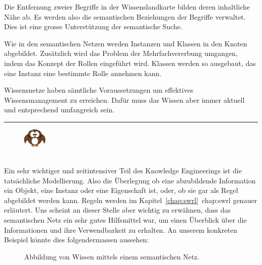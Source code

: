 Die Entfernung zweier Begriffe in der Wissenslandkarte bilden deren inhaltliche Nähe ab. Es werden also die semantischen Beziehungen der Begriffe verwaltet. Dies ist eine grosse Unterstützung der semantische Suche.

Wie in den semantischen Netzen werden Instanzen und Klassen in den Knoten abgebildet. Zusätzlich wird das Problem der Mehrfachvererbung umgangen, indem das Konzept der Rollen eingeführt wird. Klassen werden so ausgebaut, das eine Instanz eine bestimmte Rolle annehmen kann.

Wissensnetze haben sämtliche Voraussetzungen um effektives Wissensmanagement zu erreichen. Dafür muss das Wissen aber immer aktuell und entsprechend umfangreich sein.

\newpage

\noindent\rule[1ex]{\textwidth}{1pt}
\begin{figure}
    \vspace{-2pt}
    \includegraphics[width=0.1\textwidth]{bilder/owl.png}
\end{figure}\\
Ein sehr wichtiger und zeitintensiver Teil des Knowledge Engineerings ist die tatsächliche Modellierung. Also die Überlegung ob eine abzubildende Information ein Objekt, eine Instanz oder eine Eigenschaft ist, oder, ob sie gar als Regel abgebildet werden kann. Regeln werden im Kapitel~\ref{chap:swrl}~\refname{chap:swrl} genauer erläutert. Uns scheint an dieser Stelle aber wichtig zu erwähnen, dass das semantischen Netz ein sehr gutes Hilfsmittel war, um einen Überblick über die Informationen und ihre Verwendbarkeit zu erhalten.
An unserem konkreten Beispiel könnte dies folgendermassen aussehen:

\begin{figure}[H]
\centering {}
\caption{Abbildung von Wissen mittels einem semantischen Netz.\label{fig:semantischesNetz}\protect\footnotemark}
\end{figure}

